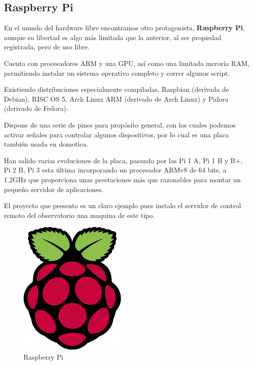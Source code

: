 \newpage

\subsection{Raspberry Pi}

En el mundo del hardware libre encontramos otro protagonista,
\textbf{Raspberry Pi}, aunque su libertad es algo más limitada que la anterior, al ser propiedad registrada, pero de uso libre.

\bigskip
Cuenta con procesadores ARM y una GPU, así como una limitada meroría RAM, permitiendo instalar un sistema operativo completo y correr algunos script. 

\bigskip
Existiendo distribuciones especialmente compiladas, Raspbian (derivada de Debian), RISC OS 5, Arch Linux ARM (derivado de Arch Linux) y Pidora (derivado de Fedora).

\bigskip
Dispone de una serie de pines para propósito general, con los cuales podemos activar señales para controlar algunos dispositivos, por lo cual es una placa también usada en domotica.

\bigskip
Han salido varias evoluciones de la placa, pasando por las Pi 1 A, Pi 1 B y B+, Pi 2 B, Pi 3 esta última incorporando un procesador ARMv8 de 64 bits, a 1.2GHz que proporciona unas prestaciones más que razonables para montar un pequeño servidor de aplicaciones. 

El proyecto que presento es un claro ejemplo pues instalo el servidor de control remoto del observatorio una maquina de este tipo.




\begin{figure}[h]
\centering
\includegraphics[width=0.2\linewidth]{../images/raspberry}
\caption[Raspberry Pi]{Raspberry Pi}
\label{fig:raspberry}
\end{figure}




  